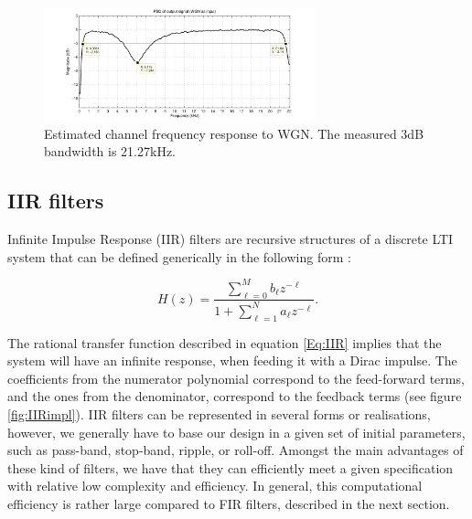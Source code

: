 \documentclass[12pt,a4paper,openright]{report}
\begin{document}
\begin{figure}[H]
\centering
\includegraphics[width=0.7\textwidth]{ChannelResponse.pdf}
\caption[Estimated channel frequency response to WGN]{Estimated channel frequency response to WGN. The measured 3dB bandwidth is 21.27kHz.}
\label{fig:channelresp}
\end{figure}


\subsection{IIR filters}
Infinite Impulse Response (IIR) filters are recursive structures of a discrete LTI system that can be defined generically in the following form \cite{DSPDiniz}:

\begin{equation}\label{Eq:IIR}
H\left( z \right) = \frac{{\sum\limits_{\ell  = 0}^M {{b_\ell }{z^{ - \ell }}} }}{{1 + \sum\limits_{\ell = 1}^N {{a_\ell }{z^{ - \ell }}} }}.
\end{equation}

 The rational transfer function described in equation \ref{Eq:IIR} implies that the system will have an infinite response, when feeding it with a Dirac impulse. The coefficients from the numerator polynomial correspond to the feed-forward terms, and the ones from the denominator, correspond to the feedback terms (see figure \ref{fig:IIRimpl}). IIR filters can be represented in several forms or realisations, however, we generally have to base our design in a given set of initial parameters, such as pass-band, stop-band, ripple, or roll-off. Amongst the main advantages of these kind of filters, we have that they can efficiently meet a given specification with relative low complexity and efficiency.  In general, this  computational efficiency is rather large compared to FIR filters, described in the next section.
 
\end{document}
